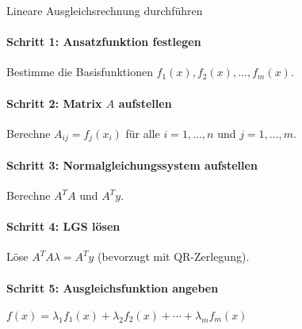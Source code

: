 \begin{KR}{Lineare Ausgleichsrechnung durchführen}
\paragraph{Schritt 1: Ansatzfunktion festlegen}
Bestimme die Basisfunktionen $f_1(x), f_2(x), ..., f_m(x)$.

\paragraph{Schritt 2: Matrix $A$ aufstellen}
Berechne $A_{ij} = f_j(x_i)$ für alle $i = 1, ..., n$ und $j = 1, ..., m$.

\paragraph{Schritt 3: Normalgleichungssystem aufstellen}
Berechne $A^T A$ und $A^T y$.

\paragraph{Schritt 4: LGS lösen}
Löse $A^T A \lambda = A^T y$ (bevorzugt mit QR-Zerlegung).

\paragraph{Schritt 5: Ausgleichsfunktion angeben}
$f(x) = \lambda_1 f_1(x) + \lambda_2 f_2(x) + \cdots + \lambda_m f_m(x)$
\end{KR}

